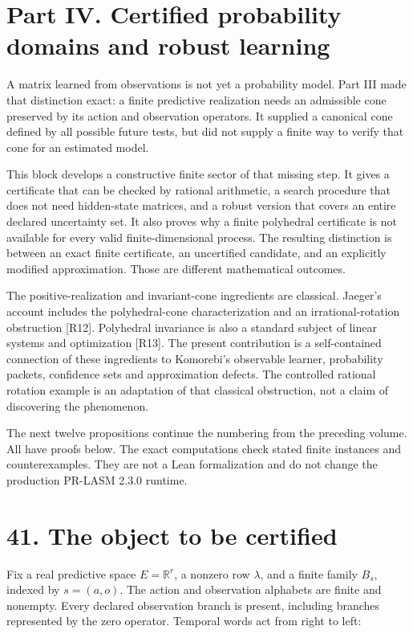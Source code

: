 \documentclass[11pt,letterpaper]{article}
\begin{document}
\newpage

\section{Part IV. Certified probability domains and robust
learning}\label{part-iv.-certified-probability-domains-and-robust-learning}

A matrix learned from observations is not yet a probability model. Part
III made that distinction exact: a finite predictive realization needs
an admissible cone preserved by its action and observation operators. It
supplied a canonical cone defined by all possible future tests, but did
not supply a finite way to verify that cone for an estimated model.

This block develops a constructive finite sector of that missing step.
It gives a certificate that can be checked by rational arithmetic, a
search procedure that does not need hidden-state matrices, and a robust
version that covers an entire declared uncertainty set. It also proves
why a finite polyhedral certificate is not available for every valid
finite-dimensional process. The resulting distinction is between an
exact finite certificate, an uncertified candidate, and an explicitly
modified approximation. Those are different mathematical outcomes.

The positive-realization and invariant-cone ingredients are classical.
Jaeger's account includes the polyhedral-cone characterization and an
irrational-rotation obstruction {[}R12{]}. Polyhedral invariance is also
a standard subject of linear systems and optimization {[}R13{]}. The
present contribution is a self-contained connection of these ingredients
to Komorebi's observable learner, probability packets, confidence sets
and approximation defects. The controlled rational rotation example is
an adaptation of that classical obstruction, not a claim of discovering
the phenomenon.

The next twelve propositions continue the numbering from the preceding
volume. All have proofs below. The exact computations check stated
finite instances and counterexamples. They are not a Lean formalization
and do not change the production PR-LASM 2.3.0 runtime.

\section{41. The object to be
certified}\label{the-object-to-be-certified}

Fix a real predictive space \(E=\mathbb R^r\), a nonzero row
\(\lambda\), and a finite family \(B_s\), indexed by \(s=(a,o)\). The
action and observation alphabets are finite and nonempty. Every declared
observation branch is present, including branches represented by the
zero operator. Temporal words act from right to left:
\end{document}
